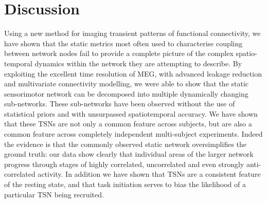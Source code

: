 \section{Discussion}\label{sec_kmeans_discus}
Using a new method for imaging transient patterns of functional connectivity, we have shown that the static metrics most often used to characterise coupling between network nodes fail to provide a complete picture of the complex spatio-temporal dynamics within the network they are attempting to describe. By exploiting the excellent time resolution of MEG, with advanced leakage reduction and multivariate connectivity modelling, we were able to show that the static sensorimotor network can be decomposed into multiple dynamically changing sub-networks. These sub-networks have been observed without the use of statistical priors and with unsurpassed spatiotemporal accuracy. We have shown that these TSNs are not only a common feature across subjects, but are also a common feature across completely independent multi-subject experiments. Indeed the evidence is that the commonly observed static network oversimplifies the ground truth: our data show clearly that individual areas of the larger network progress through stages of highly correlated, uncorrelated and even strongly anti-correlated activity. In addition we have shown that TSNs are a consistent feature of the resting state, and that task initiation serves to bias the likelihood of a particular TSN being recruited.

